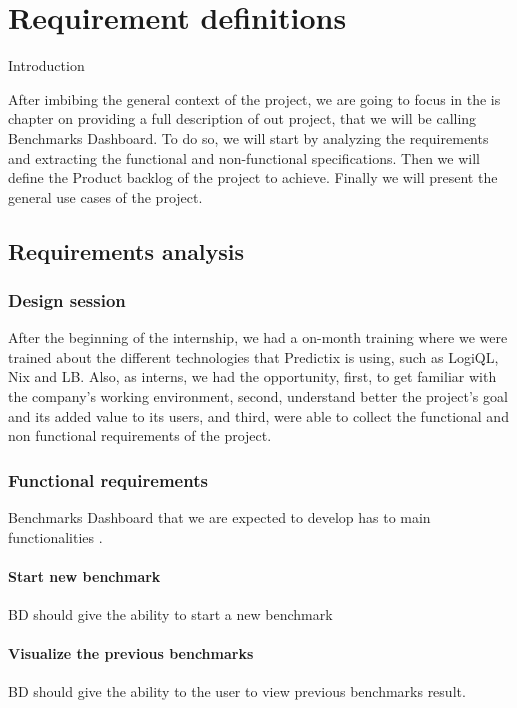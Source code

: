 \chapter{Requirement definitions}

Introduction

After imbibing the general context of the project, we are going to focus in
the is chapter on providing a full description of out project, that we will be
calling Benchmarks Dashboard. To do so, we will start by analyzing the
requirements and extracting the  functional and non-functional specifications.
Then we will define the Product backlog of the project to achieve. Finally we
will present the general use cases of the project.

\section{Requirements analysis}

\subsection{Design session}
After  the beginning of the internship, we had a on-month training where we were
trained about the different technologies that Predictix is using, such as
LogiQL, Nix and LB. Also, as interns, we had the opportunity, first, to get
familiar with the company's working environment, second, understand better the
project's goal and its added value to its users, and third, were able to collect
the functional and non functional requirements of the project.


\subsection{Functional requirements}
Benchmarks Dashboard that we are expected to develop has to main
functionalities . 

\subsubsection{Start new benchmark}
BD should give the ability to start a new benchmark 

\subsubsection{Visualize the previous benchmarks}
BD should give the ability to the user to view previous benchmarks result. 


